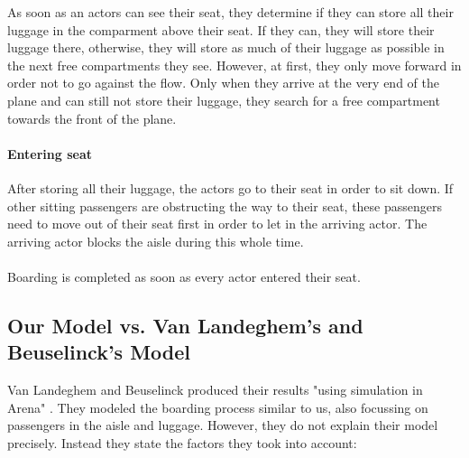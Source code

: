 \documentclass[11pt]{article}
\begin{document}
	As soon as an actors can see their seat, they determine if they can store all their luggage in the comparment above their seat. If they can, they will store their luggage there, otherwise, they will store as much of their luggage as possible in the next free compartments they see. However, at first, they only move forward in order not to go against the flow. Only when they arrive at the very end of the plane and can still not store their luggage, they search for a free compartment towards the front of the plane.


\paragraph{Entering seat}
After storing all their luggage, the actors go to their seat in order to sit down. If other sitting passengers are obstructing the way to their seat, these passengers need to move out of their seat first in order to let in the arriving actor. The arriving actor blocks the aisle during this whole time.
\\\\
Boarding is completed as soon as every actor entered their seat.






\subsection{Our Model vs. Van Landeghem's and Beuselinck's Model} 

Van Landeghem and Beuselinck produced their results "using simulation in Arena" \cite{beus}. They modeled the boarding process similar to us, also focussing on passengers in the aisle and luggage. However, they do not explain their model precisely. Instead they state the factors they took into account:
\end{document}
